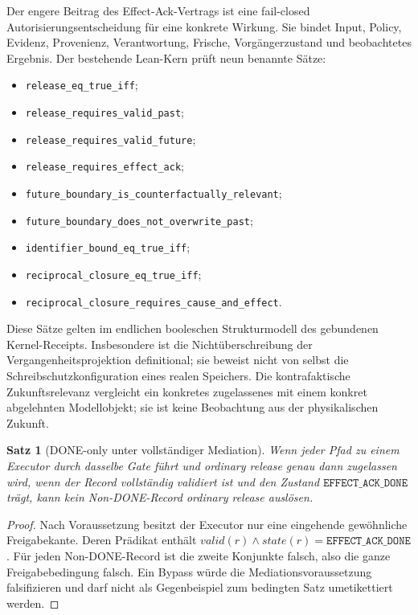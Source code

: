 \documentclass[11pt,a4paper]{article}
\newtheorem{satz}{Satz}[section]
\theoremstyle{remark}
\newcommand{\DONE}{\texttt{EFFECT\_ACK\_DONE}}
\begin{document}
Der engere Beitrag des Effect-Ack-Vertrags ist eine fail-closed
Autorisierungsentscheidung für eine konkrete Wirkung. Sie bindet Input,
Policy, Evidenz, Provenienz, Verantwortung, Frische, Vorgängerzustand und
beobachtetes Ergebnis. Der bestehende Lean-Kern prüft neun benannte Sätze:

\begin{itemize}
  \item \texttt{release\_eq\_true\_iff};
  \item \texttt{release\_requires\_valid\_past};
  \item \texttt{release\_requires\_valid\_future};
  \item \texttt{release\_requires\_effect\_ack};
  \item \texttt{future\_boundary\_is\_counterfactually\_relevant};
  \item \texttt{future\_boundary\_does\_not\_overwrite\_past};
  \item \texttt{identifier\_bound\_eq\_true\_iff};
  \item \texttt{reciprocal\_closure\_eq\_true\_iff};
  \item \texttt{reciprocal\_closure\_requires\_cause\_and\_effect}.
\end{itemize}

Diese Sätze gelten im endlichen booleschen Strukturmodell des gebundenen
Kernel-Receipts. Insbesondere ist die Nichtüberschreibung der
Vergangenheitsprojektion definitional; sie beweist nicht von selbst die
Schreibschutzkonfiguration eines realen Speichers. Die kontrafaktische
Zukunftsrelevanz vergleicht ein konkretes zugelassenes mit einem konkret
abgelehnten Modellobjekt; sie ist keine Beobachtung aus der physikalischen
Zukunft.

\begin{satz}[DONE-only unter vollständiger Mediation]
Wenn jeder Pfad zu einem Executor durch dasselbe Gate führt und ordinary
release genau dann zugelassen wird, wenn der Record vollständig validiert
ist und den Zustand \(\DONE\) trägt, kann kein Non-DONE-Record ordinary
release auslösen.
\end{satz}

\begin{proof}
Nach Voraussetzung besitzt der Executor nur eine eingehende gewöhnliche
Freigabekante. Deren Prädikat enthält \(\mathit{valid}(r)\land
\mathit{state}(r)=\DONE\). Für jeden Non-DONE-Record ist die zweite Konjunkte
falsch, also die ganze Freigabebedingung falsch. Ein Bypass würde die
Mediationsvoraussetzung falsifizieren und darf nicht als Gegenbeispiel zum
bedingten Satz umetikettiert werden.
\end{proof}
\end{document}
